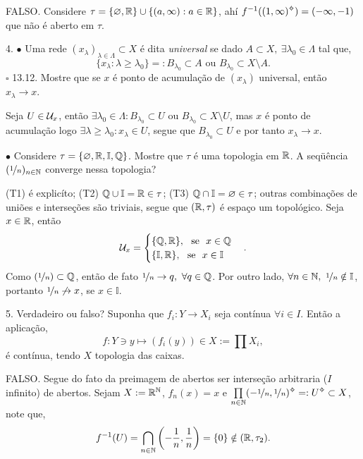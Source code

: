 \textcolor{gris}{FALSO. Considere \(\tau = \{\varnothing , \mathbb{R}\} \cup \{(a,\infty) : a \in \mathbb{R}\}\), ahí \(f^{-1}((1,\infty)\ab) = (-\infty, -1)\) que não é aberto em \(\tau\). }

4. \(\bullet \) Uma rede \((x_\lambda)_{\lambda \in \Lambda} \subset X\) é dita \emph{universal} se dado \( A\subset X, \ \exists \lambda_0 \in \Lambda\) tal que,  
\[\{x_\lambda : \lambda \geq \lambda_0\} =: B_{\lambda_0} \subset A \text{ \ ou \ } B_{\lambda_0} \subset X \setminus A .\] 
\(\square\) 13.12. Mostre que se \(x\) é ponto de acumulação de \((x_\lambda)\) universal, então \(x_\lambda \to x \). 

\textcolor{gris}{Seja \(U \in \mathcal{U}_x\), então \(\exists \lambda_0 \in \Lambda : B_{\lambda_0} \subset U\) ou \(B_{\lambda_0} \subset X \setminus U \), mas \(x\) é ponto de acumulação logo \(\exists \lambda \geq \lambda_0: x_\lambda \in U\), segue que \(B_{\lambda_0} \subset U\) e por tanto \(x_\lambda \to x\). } 

\(\bullet\) Considere \(\tau = \{\varnothing, \mathbb{R}, \mathbb{I}, \mathbb{Q}\}\). Mostre que \(\tau\) é uma topologia em \(\mathbb{R}\). A seqüência \((\nicefrac{1}{n})_{n \in \mathbb{N}}\) converge nessa topologia?  

\textcolor{gris}{(T1) é explicíto; (T2) \(\mathbb{Q} \cup \mathbb{I} = \mathbb{R} \in \tau\); (T3) \(\mathbb{Q} \cap \mathbb{I} = \varnothing \in \tau\); outras combinações de uniões e interseções são triviais, segue que \((\mathbb{R}, \tau)\) é espaço um topológico. Seja \(x \in \mathbb{R}\), então 
\[\mathcal{U}_x = \begin{cases}
\{\mathbb{Q}, \mathbb{R}\}, \ \ \text{se \ } x \in \mathbb{Q} \\ 
\{\mathbb{I}, \mathbb{R}\}, \ \ \text{se \ } x \in \mathbb{I} \\ 
\end{cases}.\]  
Como \((\nicefrac{1}{n}) \subset \mathbb{Q}\), então de fato \(\nicefrac{1}{n} \to q, \  \forall q \in \mathbb{Q}\). Por outro lado, \(\forall n \in \N, \ \nicefrac{1}{n} \notin \mathbb{I}\), portanto \(\nicefrac{1}{n} \not\to x\), se \(x \in \mathbb{I}\).}  

5. Verdadeiro ou falso? Suponha que \(f_i : Y \to X_i\) seja contínua \(\forall i \in I\). Então a aplicação,   
\[f: Y \ni y \mapsto (f_i(y)) \in X := \prod X_i,\]
é contínua, tendo \(X\) topologia das caixas.  

\textcolor{gris}{FALSO. Segue do fato da preimagem de abertos ser interseção arbitraria (\(I\) infinito) de abertos. Sejam \(X := \mathbb{R}^{\mathbb{N}}\), \(f_n(x) = x\) e \(\underset{n\in \N}{\prod} (-\nicefrac{1}{n}, \nicefrac{1}{n})\ab =: U\ab \subset X\), note que, 
\[f^{-1}(U) = \bigcap_{n \in \mathbb{N}}\left(-\frac{1}{n}, \frac{1}{n}\right) = \{0\} \notin (\mathbb{R}, \tau_2). \]}
 
